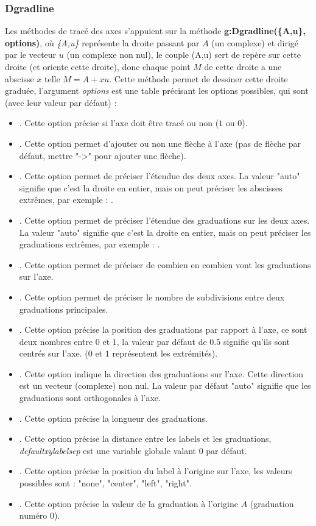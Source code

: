 \subsubsection{Dgradline}

Les méthodes de tracé des axes s'appuient sur la méthode \textbf{g:Dgradline(\{A,u\}, options)}, où \emph{\{A,u\}} représente la droite passant par $A$ (un complexe) et dirigé par le vecteur $u$ (un complexe non nul), le couple (A,u) sert de repère sur cette droite (et oriente cette droite), donc chaque point $M$ de cette droite a une abscisse $x$ telle $M=A+xu$. Cette méthode permet de dessiner cette droite graduée, l'argument \emph{options} est une table précisant les options possibles, qui sont (avec leur valeur par défaut) :
\begin{itemize}
    \item {}. Cette option précise si l'axe doit être tracé ou non ($1$ ou $0$).
    \item {}. Cette option permet d'ajouter ou non une flèche à l'axe (pas de flèche par défaut, mettre "->" pour ajouter une flèche).
    \item {}. Cette option permet de préciser l'étendue des deux axes. La valeur "auto" signifie que c'est la droite en entier, mais on peut préciser les abscisses extrêmes, par exemple : .
    \item {}. Cette option permet de préciser l'étendue des graduations sur les deux axes. La valeur "auto" signifie que c'est la droite en entier, mais on peut préciser les graduations extrêmes, par exemple : .
    \item {}. Cette option permet de préciser de combien en combien vont les graduations sur l'axe.
    \item {}. Cette option permet de préciser le nombre de subdivisions entre deux graduations principales.
    \item {}. Cette option précise la position des graduations par rapport à l'axe, ce sont deux nombres entre $0$ et $1$, la valeur par défaut de $0.5$ signifie qu'ils sont centrés sur l'axe. ($0$ et $1$ représentent les extrémités).
    \item {}. Cette option indique la direction des graduations sur l'axe. Cette direction est un vecteur (complexe) non nul. La valeur par défaut "auto" signifie que les graduations sont orthogonales à l'axe.
    \item {}. Cette option précise la longueur des graduations.
    \item {}. Cette option précise la distance entre les labels et les graduations, \emph{defaultxylabelsep} est une variable globale valant $0$ par défaut.
    \item {}. Cette option précise la position du label à l'origine sur l'axe, les valeurs possibles sont : "none", "center", "left", "right".
    \item {}. Cette option précise la valeur de la graduation à l'origine $A$ (graduation numéro $0$).
    

\end{itemize}
